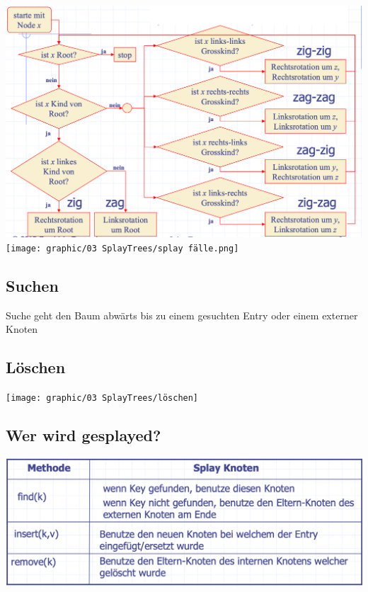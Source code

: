 \vspace{-8pt}
\begin{center}
    \includegraphics[scale=.2]{graphic/03 SplayTrees/splay.png}
    \texttt{[image: graphic/03 SplayTrees/splay fälle.png]}
\end{center}
\vspace{-8pt}

\subsection{Suchen}
Suche geht den Baum abwärts bis zu einem gesuchten Entry oder einem externer Knoten

\subsection{Löschen}
\begin{center}
    \texttt{[image: graphic/03 SplayTrees/löschen]}
\end{center}
\vspace{-8pt}

\subsection{Wer wird gesplayed?}
\begin{center}
    \includegraphics[scale=.25]{graphic/03 SplayTrees/who.png}
\end{center}


